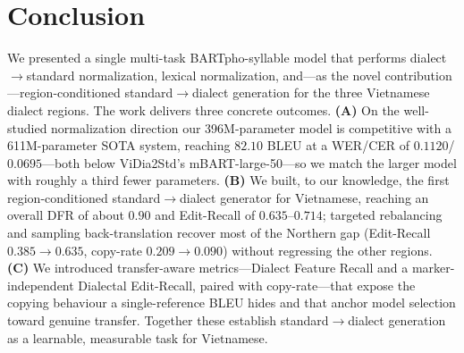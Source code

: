 \documentclass[11pt]{article}
\begin{document}
\section{Conclusion}
\label{sec:conclusion}

We presented a single multi-task BARTpho-syllable model that performs
dialect$\rightarrow$standard normalization, lexical normalization, and---as the
novel contribution---region-conditioned standard$\rightarrow$dialect generation
for the three Vietnamese dialect regions. The work delivers three concrete
outcomes. \textbf{(A)} On the well-studied normalization direction our 396M-parameter
model is competitive with a 611M-parameter SOTA system, reaching $82.10$ BLEU at a
WER/CER of $0.1120$/$0.0695$---both below ViDia2Std's mBART-large-50---so we match
the larger model with roughly a third fewer parameters. \textbf{(B)} We built, to
our knowledge, the first region-conditioned standard$\rightarrow$dialect generator
for Vietnamese, reaching an overall DFR of about $0.90$ and Edit-Recall of
$0.635$--$0.714$; targeted rebalancing and sampling back-translation recover most
of the Northern gap (Edit-Recall $0.385\!\rightarrow\!0.635$, copy-rate
$0.209\!\rightarrow\!0.090$) without regressing the other regions. \textbf{(C)} We
introduced transfer-aware metrics---Dialect Feature Recall and a marker-independent
Dialectal Edit-Recall, paired with copy-rate---that expose the copying behaviour a
single-reference BLEU hides and that anchor model selection toward genuine
transfer. Together these establish standard$\rightarrow$dialect generation as a
learnable, measurable task for Vietnamese.



\end{document}

